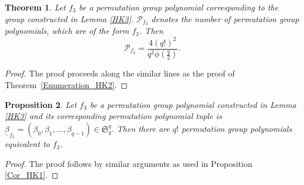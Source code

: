 \documentclass[11pt]{amsart}
\theoremstyle{plain}
\newtheorem{thm}{Theorem}[section]
\newtheorem{prop}[thm]{Proposition}
\numberwithin{equation}{section}
\begin{document}
\begin{thm}\label{Enumeration_HK3}
Let $f_3$ be a permutation group polynomial corresponding to the group constructed in Lemma \ref{HK3}. $\mathcal{P}_{f_3}$ denotes the number of permutation group polynomials, which are of the form $f_3$. Then
\[
\mathcal{P}_{f_3}=\dfrac{4(q!)^2}{q^2\phi(\frac{q}{2})}.
\]
\end{thm}
\begin{proof}
The proof proceeds along the similar lines as the proof of Theorem~\ref{Enumeration_HK2}.    
\end{proof}
\begin{prop}
Let $f_3$ be a permutation group polynomial constructed in Lemma \ref{HK3} and its corresponding permutation polynomial tuple is $\underline{\beta}_{f_3}=(\beta_0,\beta_1,\ldots,\beta_{q-1})\in \mathfrak{S}_q^{q}$. Then there are $q!$ permutation group polynomials equivalent to $f_3$.
\end{prop}
\begin{proof}
The proof follows by similar arguments as used in Proposition  \ref{Cor_HK1}.
  \end{proof}
\end{document}
